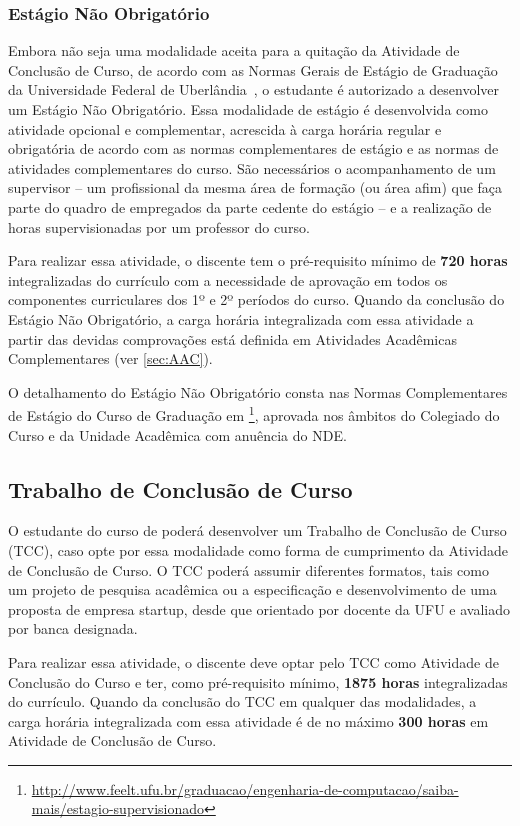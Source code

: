 \subsubsection{Estágio Não Obrigatório}

Embora não seja uma modalidade aceita para a quitação da Atividade de Conclusão de Curso, de acordo com as Normas Gerais de Estágio de Graduação da Universidade Federal de Uberlândia~\cite{UFU:CONGRAD:93:2023}, o estudante é autorizado a desenvolver um Estágio Não Obrigatório. Essa modalidade de estágio é desenvolvida como atividade opcional e complementar, acrescida à carga horária regular e obrigatória de acordo com as normas complementares de estágio e as normas de atividades complementares do curso. São necessários o acompanhamento de um supervisor -- um profissional da mesma área de formação (ou área afim) que faça parte do quadro de empregados da parte cedente do estágio -- e a realização de horas supervisionadas por um professor do curso.

Para realizar essa atividade, o discente tem o pré-requisito mínimo de \textbf{720 horas} integralizadas do currículo com a necessidade de aprovação em todos os componentes curriculares dos 1º e 2º períodos do curso. Quando da conclusão do Estágio Não Obrigatório, a carga horária integralizada com essa atividade a partir das devidas comprovações está definida em Atividades Acadêmicas Complementares (ver \autoref{sec:AAC}).

O detalhamento do Estágio Não Obrigatório consta nas Normas Complementares de Estágio do Curso de Graduação em \ppccurso\footnote{\url{http://www.feelt.ufu.br/graduacao/engenharia-de-computacao/saiba-mais/estagio-supervisionado}}, aprovada nos âmbitos do Colegiado do Curso e da Unidade Acadêmica com anuência do NDE.

\subsection{Trabalho de Conclusão de Curso}

O estudante do curso de \ppccurso poderá desenvolver um Trabalho de Conclusão de Curso (TCC), caso opte por essa modalidade como forma de cumprimento da Atividade de Conclusão de Curso. O TCC poderá assumir diferentes formatos, tais como um projeto de pesquisa acadêmica ou a especificação e desenvolvimento de uma proposta de empresa startup, desde que orientado por docente da UFU e avaliado por banca designada.

Para realizar essa atividade, o discente deve optar pelo TCC como Atividade de Conclusão do Curso e ter, como pré-requisito mínimo, \textbf{1875 horas} integralizadas do currículo. Quando da conclusão do TCC em qualquer das modalidades, a carga horária integralizada com essa atividade é de no máximo \textbf{300 horas} em Atividade de Conclusão de Curso.

